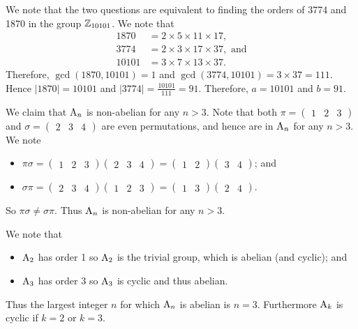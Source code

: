 \begin{questions}
    \item We note that the two questions are equivalent to finding the orders of 3774 and 1870 in the group $\mathbb{Z}_{10101}$. We note that
    \begin{align*}
        1870 &= 2 \times 5 \times 11 \times 17,\\
        3774 &= 2 \times 3 \times 17 \times 37, \text{ and}\\
        10101 &= 3 \times 7 \times 13 \times 37.
    \end{align*}
    Therefore, $\gcd(1870, 10101) = 1$ and $\gcd(3774, 10101) = 3 \times 37 = 111$. Hence $|1870| = 10101$ and $|3774| = \frac{10101}{111} = 91$. Therefore, $a = 10101$ and $b = 91$.

    \item We claim that $\mathrm{A}_{n}$ is non-abelian for any $n > 3$. Note that both $\pi = \begin{pmatrix}1 & 2 & 3\end{pmatrix}$ and $\sigma = \begin{pmatrix}2 & 3 & 4\end{pmatrix}$ are even permutations, and hence are in $\mathrm{A}_{n}$ for any $n > 3$. We note
    \begin{itemize}
        \item $\pi\sigma = \begin{pmatrix}1 & 2 & 3\end{pmatrix}\begin{pmatrix}2 & 3 & 4\end{pmatrix} = \begin{pmatrix}1 & 2\end{pmatrix}\begin{pmatrix}3 & 4\end{pmatrix}$; and
        \item $\sigma\pi = \begin{pmatrix}2 & 3 & 4\end{pmatrix}\begin{pmatrix}1 & 2 & 3\end{pmatrix} = \begin{pmatrix}1 & 3\end{pmatrix}\begin{pmatrix}2 & 4\end{pmatrix}$.
    \end{itemize}
    So $\pi\sigma \neq \sigma\pi$. Thus $\mathrm{A}_{n}$ is non-abelian for any $n > 3$.

    We note that
    \begin{itemize}
        \item $\mathrm{A}_{2}$ has order 1 so $\mathrm{A}_{2}$ is the trivial group, which is abelian (and cyclic); and
        \item $\mathrm{A}_{3}$ has order 3 so $\mathrm{A}_{3}$ is cyclic and thus abelian.
    \end{itemize}
    Thus the largest integer $n$ for which $\mathrm{A}_{n}$ is abelian is $n = 3$. Furthermore $\mathrm{A}_{k}$ is cyclic if $k = 2$ or $k = 3$.


\end{questions}
